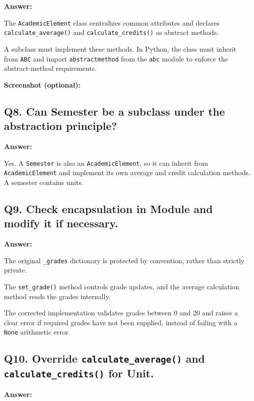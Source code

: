 \documentclass[a4paper,12pt]{article}
\begin{document}
	\textbf{Answer:}
	
	The \texttt{AcademicElement} class centralizes common attributes and declares \texttt{calculate\_average()} and \texttt{calculate\_credits()} as abstract methods.
	
	A subclass must implement these methods. In Python, the class must inherit from \texttt{ABC} and import \texttt{abstractmethod} from the \texttt{abc} module to enforce the abstract-method requirements.
	
	\textbf{Screenshot (optional):}
	
	
	\subsection*{Q8. Can Semester be a subclass under the abstraction principle?}
	
	\textbf{Answer:}
	
	Yes. A \texttt{Semester} is also an \texttt{AcademicElement}, so it can inherit from \texttt{AcademicElement} and implement its own average and credit calculation methods. A semester contains units.
	
	\subsection*{Q9. Check encapsulation in Module and modify it if necessary.}
	
	\textbf{Answer:}
	
	The original \texttt{\_grades} dictionary is protected by convention, rather than strictly private.
	
	The \texttt{set\_grade()} method controls grade updates, and the average calculation method reads the grades internally.
	
	The corrected implementation validates grades between 0 and 20 and raises a clear error if required grades have not been supplied, instead of failing with a \texttt{None} arithmetic error.
	
	\subsection*{Q10. Override \texttt{calculate\_average()} and \texttt{calculate\_credits()} for Unit.}
	
	\textbf{Answer:}
	
\end{document}
